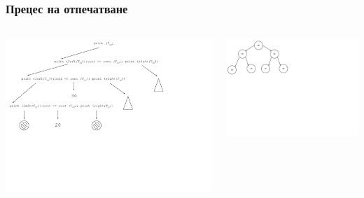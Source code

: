 \documentclass{beamer}
\begin{document}
\begin{frame}[fragile]
\frametitle{Прецес на отпечатване}



\begin{columns}[t]
  \begin{column}{0.65\textwidth}
\includegraphics[width=14cm]{images/tree_print_process}
  \end{column}
  \begin{column}{0.35\textwidth}
  \vspace{-160px}
\includegraphics[width=9cm]{images/tree_bot_clean}

  \end{column}
\end{columns}
\end{frame}
\end{document}
